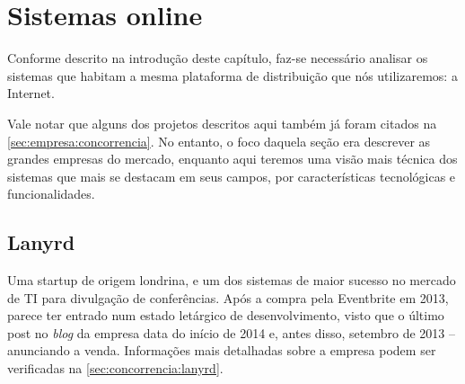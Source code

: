 \documentclass[12pt,a4paper,twoside,hyphens,english,brazil]{abntex2}
\begin{document}
\section{Sistemas online} \label{sec:sistemas:online}
Conforme descrito na introdução deste capítulo, faz-se necessário analisar os sistemas que habitam a mesma plataforma de distribuição que nós utilizaremos: a Internet.

Vale notar que alguns dos projetos descritos aqui também já foram citados na \autoref{sec:empresa:concorrencia}. No entanto, o foco daquela seção era descrever as grandes empresas do mercado, enquanto aqui teremos uma visão mais técnica dos sistemas que mais se destacam em seus campos, por características tecnológicas e funcionalidades.

\subsection{Lanyrd} \label{sec:concorrencia:lanyrd:tec}
Uma startup de origem londrina, e um dos sistemas de maior sucesso no mercado de TI para divulgação de conferências. Após a compra pela Eventbrite em 2013, parece ter entrado num estado letárgico de desenvolvimento, visto que o último post no \emph{blog} da empresa data do início de 2014 e, antes disso, setembro de 2013 -- anunciando a venda. Informações mais detalhadas sobre a empresa podem ser verificadas na \autoref{sec:concorrencia:lanyrd}.
\end{document}
